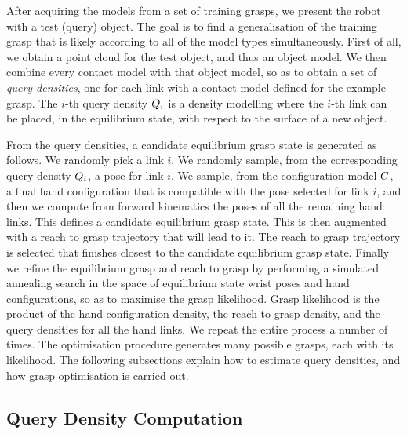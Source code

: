 
After acquiring the models from a set of training grasps, we present the robot with a test (query) object. The goal is to find a generalisation of the training grasp that is likely according to all of the model types simultaneously. First of all, we obtain a point cloud for the test object, and thus an object model. We then combine every contact model with that object model, so as to obtain a set of {\em query densities}, one for each link with a contact model defined for the example grasp. The $i$-th query density $Q_i$ is a density modelling where the $i$-th link can be placed, in the equilibrium state, with respect to the surface of a new object. 

From the query densities, a candidate equilibrium grasp state is generated as follows. We randomly pick a link $i$. We randomly sample, from the corresponding query density $Q_i$, a pose for link $i$. We sample, from the configuration model $C$, a final hand configuration that is compatible with the pose selected for link $i$, and then we compute from forward kinematics the poses of all the remaining hand links. This defines a candidate equilibrium grasp state. This is then augmented with a reach to grasp trajectory that will lead to it. The reach to grasp trajectory is selected that finishes closest to the candidate equilibrium grasp state. Finally we refine the equilibrium grasp and reach to grasp by performing a simulated annealing search in the space of equilibrium state wrist poses and hand configurations, so as to maximise the grasp likelihood. Grasp likelihood is the product of the hand configuration density, the reach to grasp density, and the query densities for all the hand links. We repeat the entire process a number of times. The optimisation procedure generates many possible grasps, each with its likelihood. The following subsections explain how to estimate query densities, and how grasp optimisation is carried out.

\subsection{Query Density Computation}

